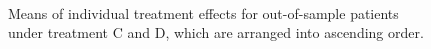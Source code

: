 	\begin{figure}[ht!]
		\begin{center}
			\\
		\end{center}
		\caption{Means of individual treatment effects for out-of-sample patients under treatment C and D, which are arranged into ascending order.}
		\label{fig4_8}
	\end{figure}
